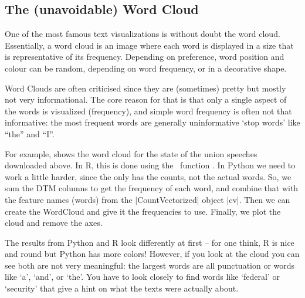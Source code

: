 \subsection{The (unavoidable) Word Cloud}

One of the most famous text visualizations is without doubt the word cloud.
Essentially, a word cloud is an image where each word is displayed in a size that is representative of its frequency.
Depending on preference, word position and colour can be random, depending on word frequency, or in a decorative shape.

Word Clouds are often criticised since they are (sometimes) pretty but mostly not very informational.
The core reason for that is that only a single aspect of the words is visualized (frequency),
and simple word frequency is often not that informative: the most frequent words are generally uninformative `stop words' like ``the'' and ``I''.

For example,  shows the word cloud for the state of the union speeches downloaded above.
In R, this is done using the \quanteda\ function .
In Python we need to work a little harder, since the only has the counts, not the actual words.
So, we sum the DTM columns to get the frequency of each word, and combine that with the feature names (words)
from the |CountVectorized| object |cv|. Then we can create the WordCloud and give it the frequencies to use.
Finally, we plot the cloud and remove the axes.


The results from Python and R look differently at first -- for one think, R is nice and round but Python has more colors!
However, if you look at the cloud you can see both are not very meaningful: the largest words are all punctuation or words like
`a', `and', or `the'.
You have to look closely to find words like `federal' or `security' that give a hint on what the texts were actually about.


